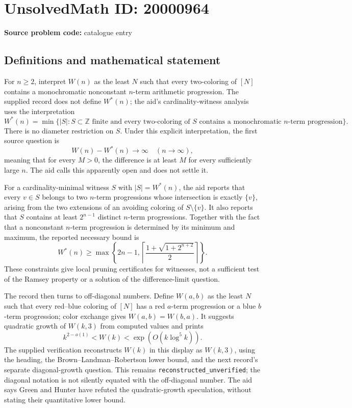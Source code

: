 \documentclass[11pt]{article}
\newcommand{\Z}{\mathbb{Z}}
\begin{document}
\section*{UnsolvedMath ID: 20000964}
\textbf{Source problem code:} catalogue entry
\subsection{Definitions and mathematical statement}
For \(n\ge2\), interpret \(W(n)\) as the least \(N\) such that every two-coloring of \([N]\) contains a monochromatic nonconstant \(n\)-term arithmetic progression. The supplied record does not define \(W^*(n)\); the aid's cardinality-witness analysis uses the interpretation
\[
 W^*(n)=\min\{|S|:S\subset\Z\text{ finite and every two-coloring of }S
 \text{ contains a monochromatic }n\text{-term progression}\}.
\]
There is no diameter restriction on \(S\). Under this explicit interpretation, the first source question is
\[
 W(n)-W^*(n)\longrightarrow\infty\quad(n\to\infty),
\]
meaning that for every \(M>0\), the difference is at least \(M\) for every sufficiently large \(n\). The aid calls this apparently open and does not settle it.

For a cardinality-minimal witness \(S\) with \(|S|=W^*(n)\), the aid reports that every \(v\in S\) belongs to two \(n\)-term progressions whose intersection is exactly \(\{v\}\), arising from the two extensions of an avoiding coloring of \(S\setminus\{v\}\). It also reports that \(S\) contains at least \(2^{n-1}\) distinct \(n\)-term progressions. Together with the fact that a nonconstant \(n\)-term progression is determined by its minimum and maximum, the reported necessary bound is
\[
 W^*(n)\ge\max\left\{2n-1,
 \left\lceil\frac{1+\sqrt{1+2^{n+2}}}{2}\right\rceil\right\}.
\]
These constraints give local pruning certificates for witnesses, not a sufficient test of the Ramsey property or a solution of the difference-limit question.

The record then turns to off-diagonal numbers. Define \(W(a,b)\) as the least \(N\) such that every red--blue coloring of \([N]\) has a red \(a\)-term progression or a blue \(b\)-term progression; color exchange gives \(W(a,b)=W(b,a)\). It suggests quadratic growth of \(W(k,3)\) from computed values and prints
\[
 k^{2-o(1)}<W(k)<\exp(O(k\log^5k)).
\]
The supplied verification reconstructs \(W(k)\) in this display as \(W(k,3)\), using the heading, the Brown--Landman--Robertson lower bound, and the next record's separate diagonal-growth question. This remains \texttt{reconstructed\_unverified}; the diagonal notation is not silently equated with the off-diagonal number. The aid says Green and Hunter have refuted the quadratic-growth speculation, without stating their quantitative lower bound.
\end{document}
